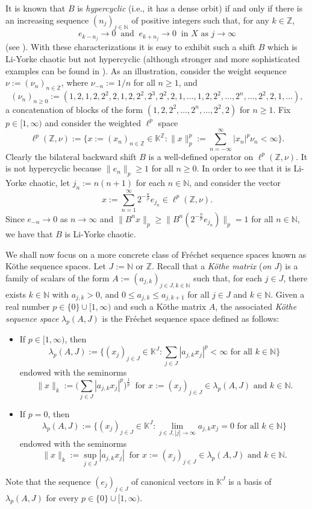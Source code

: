 \documentclass[12pt]{amsart}
\theoremstyle{theorem}
\theoremstyle{definition}
\theoremstyle{remark} \theoremstyle{question} \theoremstyle{example}
\newcommand{\N}{\mathbb{N}}
\newcommand{\Z}{\mathbb{Z}}
\newcommand{\K}{\mathbb{K}}
\begin{document}
\smallskip
It is known that $B$ is {\em hypercyclic} (i.e., it has a dense orbit) if and only if 
there is an increasing sequence $(n_j)_{j \in \N}$ of positive integers such that, for any $k \in \Z$,
\[
e_{k-n_j} \to 0 \ \text{ and } \ e_{k+n_j} \to 0 \ \text{ in } X \text{ as } j \to \infty
\]
(see \cite[Theorem~4.12]{KGroAPer11}).
With these characterizations it is easy to exhibit such a shift $B$ which is Li-Yorke chaotic but not hypercyclic
(although stronger and more sophisticated examples can be found in \cite{MarOprPer13}).
As an illustration, consider the weight sequence $\nu\!:= (\nu_n)_{n \in \Z}$, where $\nu_{-n}\!:= 1/n$ for all $n \geq 1$, and 
\[
(\nu_n)_{n \geq 0}\!:= (1,2,1,2,2^2,2,1,2,2^2,2^3,2^2,2,1,\ldots,1,2,2^2,\ldots,2^n,\ldots,2^2,2,1,\ldots),
\]
a concatenation of blocks of the form $(1,2,2^2,\ldots,2^n,\ldots,2^2,2)$ for $n \geq 1$.
Fix $p \in [1,\infty)$ and consider the weighted $\ell^p$ space
\[
\ell^p(\Z,\nu)\!:= \Big\{x\!:= (x_n)_{n \in \Z} \in \K^\Z : \|x\|_p^p\!:= \sum_{n=-\infty}^\infty |x_n|^p \nu_n < \infty\Big\}.
\]
Clearly the bilateral backward shift $B$ is a well-defined operator on $\ell^p(\Z,\nu)$.
It is not hypercyclic because $\|e_n\|_p \geq 1$ for all $n \geq 0$.
In order to see that it is Li-Yorke chaotic, let $j_n\!:= n(n+1)$ for each $n \in \N$, and consider the vector
\[
x\!:= \sum_{n=1}^\infty 2^{-\frac{n}{p}} e_{j_n} \in \ell^p(\Z,\nu).
\]
Since $e_{-n} \to 0$ as $n \to \infty$ and $\|B^n x\|_p \geq \|B^n(2^{-\frac{n}{p}} e_{j_n})\|_p = 1$ for all $n \in \N$,
we have that $B$ is Li-Yorke chaotic.

\smallskip
We shall now focus on a more concrete class of Fr\'echet sequence spaces known as K\"othe sequence spaces.
Let $J\!:= \N$ or $\Z$. Recall that a {\em K\"othe matrix} ({\em on $J$}) is a family of scalars of the form 
$A\!:= (a_{j,k})_{j \in J,k \in \N}$ such that, for each $j \in J$, there exists $k \in \N$ with $a_{j,k} > 0$,
and $0 \leq a_{j,k} \leq a_{j,k+1}$ for all $j \in J$ and $k \in \N$.
Given a real number $p \in \{0\} \cup [1,\infty)$ and such a K\"othe matrix $A$, 
the associated {\em K\"othe sequence space} $\lambda_p(A,J)$ is the Fr\'echet sequence space defined as follows:
\begin{itemize}
\item If $p \in [1,\infty)$, then 
    \[
    \lambda_p(A,J)\!:= \Big\{(x_j)_{j \in J} \in \K^J : \sum_{j \in J} |a_{j,k} x_j|^p < \infty \text{ for all } k \in \N\Big\}
    \] 
    endowed with the seminorms
    \[
    \|x\|_k\!:= \Big(\sum_{j \in J} |a_{j,k} x_j|^p\Big)^\frac{1}{p} \ \text{ for } x\!:= (x_j)_{j \in J} \in \lambda_p(A,J) \text{ and } k \in \N.
    \]
\item If $p = 0$, then 
    \[
    \lambda_p(A,J)\!:= \Big\{(x_j)_{j \in J} \in \K^J : \lim_{j \in J, |j| \to \infty} a_{j,k} x_j = 0 \text{ for all } k \in \N\Big\}
    \]
    endowed with the seminorms
    \[
    \|x\|_k\!:= \sup_{j \in J} |a_{j,k} x_j| \ \text{ for } x\!:= (x_j)_{j \in J} \in \lambda_p(A,J) \text{ and } k \in \N.
    \]
\end{itemize}
Note that the sequence $(e_j)_{j \in J}$ of canonical vectors in $\K^J$ is a basis of $\lambda_p(A,J)$ for every $p \in \{0\} \cup [1,\infty)$.
\end{document}
